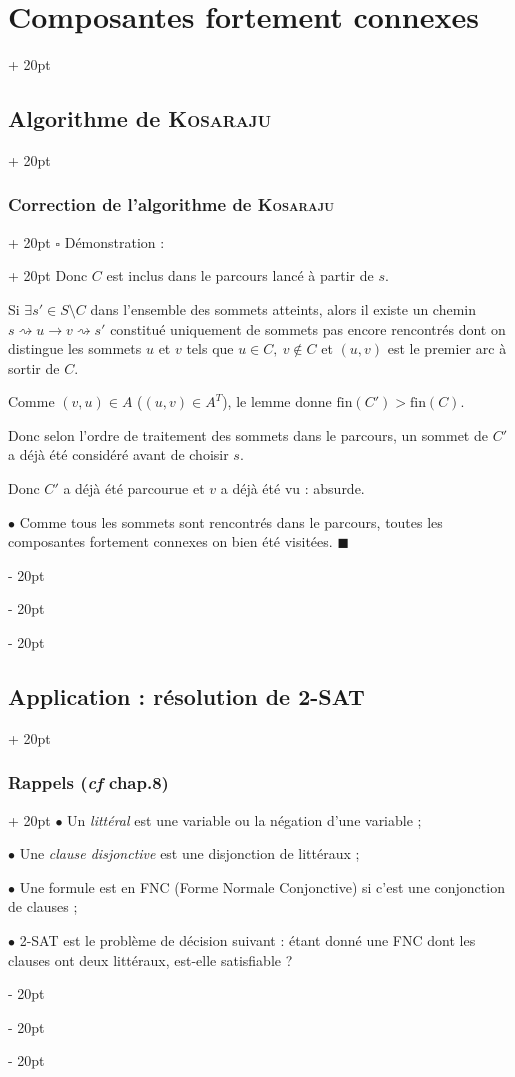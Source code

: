 \documentclass[a4paper, 12pt, twoside]{article}
\newcommand{\ind}[1][20pt]{\advance\leftskip + #1}
\newcommand{\deind}[1][20pt]{\advance\leftskip - #1}
\newenvironment{indt}[2][20pt]{#2 \par \ind[#1]}{\par \deind} %
\begin{document}
\begin{indt}{\section{Composantes fortement connexes}}
\begin{indt}{\subsection{Algorithme de \textsc{Kosaraju}}}
\begin{indt}{\subsubsection{Correction de l'algorithme de \textsc{Kosaraju}}}
\begin{indt}{$\square$ Démonstration :}
                    Donc $C$ est inclus dans le parcours lancé à partir de $s$.

                    Si $\exists s' \in S \setminus C$ dans l'ensemble des sommets atteints, alors il existe un chemin $s \rightsquigarrow u \rightarrow v \rightsquigarrow s'$ constitué uniquement de sommets pas encore rencontrés dont on distingue les sommets $u$ et $v$ tels que $u \in C,\ v \notin C$ et $(u, v)$ est le premier arc à sortir de $C$.

                    Comme $(v, u) \in A$ ($(u, v) \in A^T$), le lemme donne $\mathrm{fin}(C') > \mathrm{fin}(C)$.

                    Donc selon l'ordre de traitement des sommets dans le parcours, un sommet de $C'$ a déjà été considéré avant de choisir $s$.

                    Donc $C'$ a déjà été parcourue et $v$ a déjà été vu : absurde.

                    \vspace{12pt}
                    
                    $\bullet$ Comme tous les sommets sont rencontrés dans le parcours, toutes les composantes fortement connexes on bien été visitées. $\blacksquare$
                \end{indt}
            \end{indt}
        \end{indt}

        \vspace{12pt}
        
        \begin{indt}{\subsection{Application : résolution de 2-SAT}}
            \begin{indt}{\subsubsection{Rappels (\textit{cf} chap.8)}}
                $\bullet$ Un \textit{littéral} est une variable ou la négation d'une variable ;

                $\bullet$ Une \textit{clause disjonctive} est une disjonction de littéraux ;

                $\bullet$ Une formule est en FNC (Forme Normale Conjonctive) si c'est une conjonction de clauses ;

                $\bullet$ 2-SAT est le problème de décision suivant : étant donné une FNC dont les clauses ont deux littéraux, est-elle satisfiable ?
            \end{indt}


\end{indt}
\end{indt}
\end{document}
